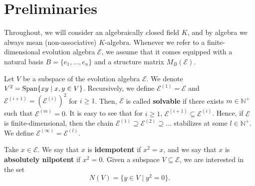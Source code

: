 \documentclass[11pt]{article}
\theoremstyle{definition}
\numberwithin{equation}{section}
\begin{document}
\section{Preliminaries}
\begin{humanblock}
Throughout, we will consider an algebraically closed field $K$, and by algebra we always mean (non-associative) $K$-algebra. Whenever we refer to a finite-dimensional evolution algebra $\mathcal E$, we assume that it comes equipped with a natural basis $B = \{e_1,\ldots, e_n\}$ and a structure matrix $M_B(\mathcal E)$.


Let $V$ be a subspace of the evolution algebra $\mathcal E$. We denote $V^2 = \operatorname{Span}\{xy\mid x,y\in V\}$. Recursively, we define $\mathcal E^{(1)} = \mathcal E$ and $\mathcal E^{(i+1)}=(\mathcal E^{(i)})^2$ for $i\geq 1$. Then, $\mathcal E$ is called \textbf{solvable} if there exists $m\in \mathbb N^+$ such that $\mathcal E^{(m)} = 0$.  It is easy to see that for $i\geq 1$, $\mathcal E^{(i+1)}\subseteq \mathcal E^{(i)}$. Hence, if $\mathcal E$ is finite-dimensional, then the chain $\mathcal E^{(1)}\supseteq \mathcal E^{(2)}\supseteq\ldots$ stabilizes at some $l\in \mathbb N^+$. We define $\mathcal E^{(\infty)} = \mathcal E^{(l)}$.

Take $x\in \mathcal E$. We say that $x$ is \textbf{idempotent} if $x^2=x$, and we say that $x$ is \textbf{absolutely nilpotent} if $x^2 = 0$. Given a subspace $V\subseteq \mathcal E$, we are interested in the set \[N(V) = \{y\in V\mid y^2 = 0\}. \]


\end{humanblock}
\end{document}
